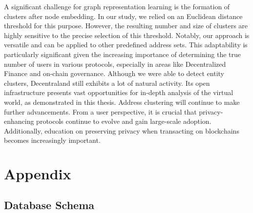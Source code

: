 \documentclass[12pt,a4paper,titlepage,oneside,english]{article}
\begin{document}
A significant challenge for graph representation learning is the formation of clusters after node embedding. In our study, we relied on an Euclidean distance threshold for this purpose. However, the resulting number and size of clusters are highly sensitive to the precise selection of this threshold. \newline
Notably, our approach is versatile and can be applied to other predefined address sets. This adaptability is particularly significant given the increasing importance of determining the true number of users in various protocols, especially in areas like Decentralized Finance and on-chain governance. \newline
Although we were able to detect entity clusters, Decentraland still exhibits a lot of natural activity. Its open infrastructure presents vast opportunities for in-depth analysis of the virtual world, as demonstrated in this thesis. \newline
Address clustering will continue to make further advancements. From a user perspective, it is crucial that privacy-enhancing protocols continue to evolve and gain large-scale adoption. Additionally, education on preserving privacy when transacting on blockchains becomes increasingly important.



\newpage
\setcounter{page}{1}
\onehalfspacing
{}



\section{Appendix}

\subsection{Database Schema}
\label{sec:database}
\end{document}
